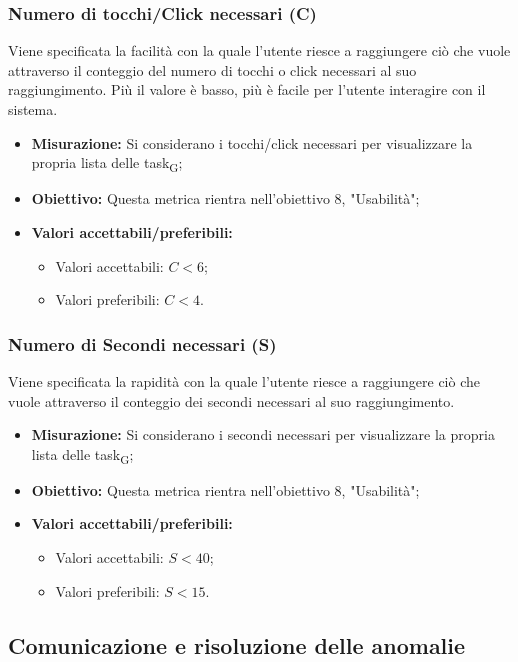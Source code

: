 \subsubsection{Numero di tocchi/Click necessari (C)}
Viene specificata la facilità con la quale l'utente riesce a raggiungere ciò che vuole attraverso il conteggio del numero di tocchi o click necessari al suo raggiungimento. Più il valore è basso, più è facile per l'utente interagire con il sistema.
\begin{itemize}
	\item \textbf{Misurazione:} Si considerano i tocchi/click necessari per visualizzare la propria lista delle task\textsubscript{G};
	\item \textbf{Obiettivo:} Questa metrica rientra nell'obiettivo 8, "Usabilità";
	\item \textbf{Valori accettabili/preferibili: }
	\begin{itemize}
		\item Valori accettabili: $C < 6$;
		\item Valori preferibili: $C < 4$.
	\end{itemize}
\end{itemize}

\subsubsection{Numero di Secondi necessari (S)}
Viene specificata la rapidità con la quale l'utente riesce a raggiungere ciò che vuole attraverso il conteggio dei secondi necessari al suo raggiungimento.
\begin{itemize}
	\item \textbf{Misurazione:} Si considerano i secondi necessari per visualizzare la propria lista delle task\textsubscript{G};
	\item \textbf{Obiettivo:} Questa metrica rientra nell'obiettivo 8, "Usabilità";
	\item \textbf{Valori accettabili/preferibili: }
	\begin{itemize}
		\item Valori accettabili: $S < 40$;
		\item Valori preferibili: $S < 15$.
	\end{itemize}
\end{itemize}


\subsection{Comunicazione e risoluzione delle anomalie}

